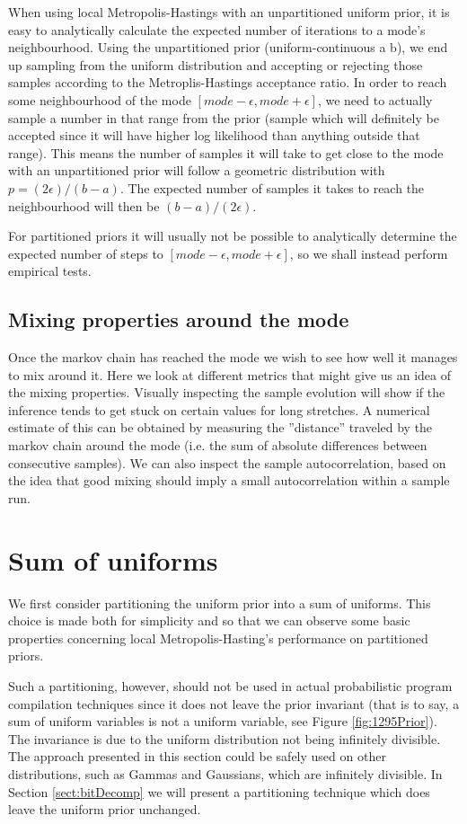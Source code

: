 When using local Metropolis-Hastings with an unpartitioned uniform prior, it is easy to analytically calculate the expected number of iterations to a mode's neighbourhood. Using the unpartitioned prior (uniform-continuous a b), we end up sampling from the uniform distribution and accepting or rejecting those samples according to the Metroplis-Hastings acceptance ratio. In order to reach some neighbourhood of the mode $[mode - \epsilon, mode + \epsilon]$, we need to actually sample a number in that range from the prior (sample which will definitely be accepted since it will have higher log likelihood than anything outside that range). This means the number of samples it will take to get close to the mode with an unpartitioned prior will follow a geometric distribution with $p = (2\epsilon)/(b-a)$. The expected number of samples it takes to reach the neighbourhood will then be $(b-a)/(2\epsilon)$.

For partitioned priors it will usually not be possible to analytically determine the expected number of steps to $[mode - \epsilon, mode + \epsilon]$, so we shall instead perform empirical tests.

\subsection{Mixing properties around the mode}
Once the markov chain has reached the mode we wish to see how well it manages to mix around it. Here we look at different metrics that might give us an idea of the mixing properties. Visually inspecting the sample evolution will show if the inference tends to get stuck on certain values for long stretches. A numerical estimate of this can be obtained by measuring the ''distance'' traveled by the markov chain around the mode (i.e. the sum of absolute differences between consecutive samples). We can also inspect the sample autocorrelation, based on the idea that good mixing should imply a small autocorrelation within a sample run.

\section{Sum of uniforms}
\label{sect:sumUnif}

We first consider partitioning the uniform prior into a sum of uniforms. This choice is made both for simplicity and so that we can observe some basic properties concerning local Metropolis-Hasting's performance on partitioned priors.

Such a partitioning, however, should not be used in actual probabilistic program compilation techniques since it does not leave the prior invariant (that is to say, a sum of uniform variables is not a uniform variable, see Figure \ref{fig:1295Prior}). The invariance is due to the uniform distribution not being infinitely divisible. The approach presented in this section could be safely used on other distributions, such as Gammas and Gaussians, which are infinitely divisible. In Section \ref{sect:bitDecomp} we will present a partitioning technique which does leave the uniform prior unchanged.

